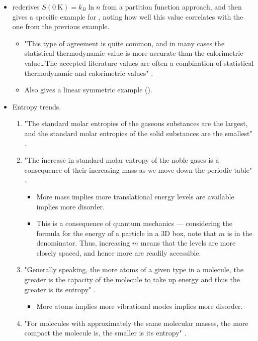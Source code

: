 \documentclass[../notes.tex]{subfiles}
\begin{document}
\begin{itemize}
\begin{itemize}
    \end{itemize}
    \item \textcite{bib:McQuarrieSimon} rederives $S(\SI{0}{\kelvin})=k_B\ln n$ from a partition function approach, and then gives a specific example for , noting how well this value correlates with the one from the previous example.
    \begin{itemize}
        \item "This type of agreement is quite common, and in many cases the statistical thermodynamic value is more accurate than the calorimetric value\dots The accepted literature values are often a combination of statistical thermodynamic and calorimetric values" \parencite[863]{bib:McQuarrieSimon}.
        \item Also gives a linear symmetric example ().
    \end{itemize}
    \item Entropy trends.
    \begin{enumerate}
        \item "The standard molar entropies of the gaseous substances are the largest, and the standard molar entropies of the solid substances are the smallest" \parencite[865]{bib:McQuarrieSimon}.
        \item "The increase in standard molar entropy of the noble gases is a consequence of their increasing mass as we move down the periodic table" \parencite[865]{bib:McQuarrieSimon}.
        \begin{itemize}
            \item More mass implies more translational energy levels are available implies more disorder.
            \item This is a consequence of quantum mechanics --- considering the formula for the energy of a particle in a 3D box, note that $m$ is in the denominator. Thus, increasing $m$ means that the levels are more closely spaced, and hence more are readily accessible.
        \end{itemize}
        \item "Generally speaking, the more atoms of a given type in a molecule, the greater is the capacity of the molecule to take up energy and thus the greater is its entropy" \parencite[866]{bib:McQuarrieSimon}.
        \begin{itemize}
            \item More atoms implies more vibrational modes implies more disorder.
        \end{itemize}
        \item "For molecules with approximately the same molecular masses, the more compact the molecule is, the smaller is its entropy" \parencite[867]{bib:McQuarrieSimon}.

\end{enumerate}
\end{itemize}
\end{document}
